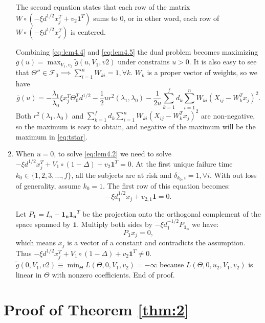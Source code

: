 \begin{enumerate}
    The second equation states that each row of the matrix $W\circ\left( -\xi d^{1/2} x_j^T+v_2\mathbf{1}^T\right)$ sums to 0, or in other word, each row of $W\circ\left(-\xi d^{1/2}x_j^T\right)$ is centered.

    Combining \eqref{eq:lem4.4} and \eqref{eq:lem4.5} the dual problem becomes maximizing $\bar{g}(u)=\max_{V_1,v_2}\tilde{g}(u,V_1,v2)$ under constrains $u>0$. It is also easy to see that $\Theta''\in\mathcal{F}_{0}\implies\sum_{i=1}^nW_{ki}=1,\forall k$. $W_k$ is a proper vector of weights, so we have
    \begin{equation}
        \label{eq:lem4.6}
        \bar{g}(u)=-\frac{\lambda_1}{\lambda_0}\xi x_j^T\Theta_{0}^Td^{1/2}-\frac{1}{2}ur^2(\lambda_1,\lambda_0)-\frac{1}{2u}\sum_{k=1}^fd_k\sum_{i=1}^nW_{ki}\left(X_{ij}-W_k^Tx_j\right)^2.
    \end{equation}
    Both $r^2(\lambda_1,\lambda_0)$ and $\sum_{k=1}^fd_k\sum_{i=1}^nW_{ki}\left(X_{ij}-W_k^Tx_j\right)^2$ are non-negative, so the maximum is easy to obtain, and negative of the maximum will be the maximum in \eqref{eq:tstar}.

    \item When $u=0$, to solve \eqref{eq:lem4.2} we need to solve $-\xi d^{1/2} x_j^T+V_1\circ(1-\Delta)+v_2\mathbf{1}^T=0.$ At the first unique failure time $k_0\in\{1,2,3,...,f\}$, all the subjects are at risk and $\delta_{k_0,i}=1,\forall i$. With out loss of generality, assume $k_0=1$. The first row of this equation becomes:
    \begin{equation}
        -\xi d_1^{1/2}x_j + v_{2,1}\mathbf{1}=0.
    \end{equation}

    Let $P_{\mathbf{1}}=I_n-\mathbf{1_n}\mathbf{1_n}^T$ be the projection onto the orthogonal complement of the space spanned by $\mathbf{1}$. Multiply both sides by $-\xi d^{-1/2}_1P_{\mathbf{1_n}}$ we have:
    \begin{equation}
        \label{eq:lem4.7}
        P_{\mathbf{1}}x_j=0,
    \end{equation}
    which means $x_j$ is a vector of a constant and contradicts the assumption. Thus $-\xi d^{1/2} x_j^T+V_1\circ(1-\Delta)+v_2\mathbf{1}^T\neq0.$ $\tilde{g}(0,V_1,v2)\equiv\min_\Theta L(\Theta,0,V_1,v_2)=-\infty$ because $L(\Theta,0,u_2,V_1,v_2)$ is linear in $\Theta$ with nonzero coefficients. End of proof.


\end{enumerate}


\section{Proof of Theorem \ref{thm:2}}

